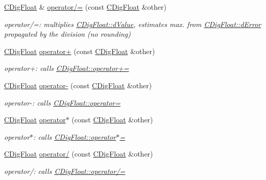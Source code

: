 \begin{DoxyCompactItemize}
\hyperlink{classCDigFloat}{C\+Dig\+Float} \& \hyperlink{classCDigFloat_a53d3939dfc89d172f1bf803a46bc3369}{operator/=} (const \hyperlink{classCDigFloat}{C\+Dig\+Float} \&other)
\begin{DoxyCompactList}\small\item\em operator/=\+: multiplies \hyperlink{classCDigFloat_a4bbe69e30dd4e20527362493aa9aaf96}{C\+Dig\+Float\+::d\+Value}, estimates max. from \hyperlink{classCDigFloat_a25eb3782d1e727ff007a48f8308e3d4d}{C\+Dig\+Float\+::d\+Error} propagated by the division (no rounding) \end{DoxyCompactList}\item 
\hyperlink{classCDigFloat}{C\+Dig\+Float} \hyperlink{classCDigFloat_a1009b21039c6d32ec4be755251679153}{operator+} (const \hyperlink{classCDigFloat}{C\+Dig\+Float} \&other)
\begin{DoxyCompactList}\small\item\em operator+\+: calls \hyperlink{classCDigFloat_a84b2ad9b4d1a75aae261074ed7c6fefe}{C\+Dig\+Float\+::operator+=} \end{DoxyCompactList}\item 
\hyperlink{classCDigFloat}{C\+Dig\+Float} \hyperlink{classCDigFloat_a8f94e4b416b59090743e59cb9423dbca}{operator-\/} (const \hyperlink{classCDigFloat}{C\+Dig\+Float} \&other)
\begin{DoxyCompactList}\small\item\em operator-\/\+: calls \hyperlink{classCDigFloat_a74f36566c2c79d7258b7b2dee35d46b2}{C\+Dig\+Float\+::operator=} \end{DoxyCompactList}\item 
\hyperlink{classCDigFloat}{C\+Dig\+Float} \hyperlink{classCDigFloat_a79029fee4d38f893d72209e7d6eb89ed}{operator$\ast$} (const \hyperlink{classCDigFloat}{C\+Dig\+Float} \&other)
\begin{DoxyCompactList}\small\item\em operator$\ast$\+: calls \hyperlink{classCDigFloat_a9535d47a31a3f1cfa487cc8c567a4a12}{C\+Dig\+Float\+::operator$\ast$=} \end{DoxyCompactList}\item 
\hyperlink{classCDigFloat}{C\+Dig\+Float} \hyperlink{classCDigFloat_a238db4ab96c398e3d2387641743d6a16}{operator/} (const \hyperlink{classCDigFloat}{C\+Dig\+Float} \&other)
\begin{DoxyCompactList}\small\item\em operator/\+: calls \hyperlink{classCDigFloat_a53d3939dfc89d172f1bf803a46bc3369}{C\+Dig\+Float\+::operator/=} \end{DoxyCompactList}\item 

\end{DoxyCompactItemize}
